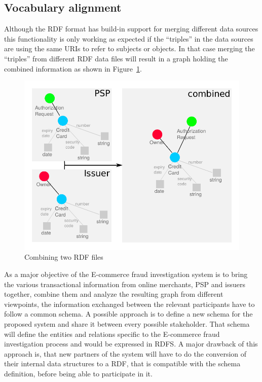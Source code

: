\subsection{Vocabulary alignment}
\label{subsec:vocab_align}

Although the \gls{RDF} format has build-in support for merging different data sources this functionality is only working as expected if the ``triples'' in the data sources are using the same \gls{URI}s to refer to subjects or objects. In that case merging the ``triples'' from different \gls{RDF} data files will result in a graph holding the combined information as shown in Figure~\ref{fig:images_combine_rdf_graph}.\@

\begin{figure}[H]
	\centering
		\includegraphics[width=0.9\columnwidth]{images/combine_rdf_graph.pdf}
	\caption{Combining two \gls{RDF} files}
\label{fig:images_combine_rdf_graph}
\end{figure}

As a major objective of the \gls{E-commerce} fraud investigation system is to bring the various transactional information from online merchants, \gls{PSP} and issuers together, combine them and analyze the resulting graph from different viewpoints, the information exchanged between the relevant participants have to follow a common schema. A possible approach is to define a new schema for the proposed system and share it between every possible stakeholder. That schema will define the entities and relations specific to the \gls{E-commerce} fraud investigation process and would be expressed in \gls{RDFS}. A major drawback of this approach is, that new partners of the system will have to do the conversion of their internal data structures to a \gls{RDF}, that is compatible with the schema definition, before being able to participate in it. \\

